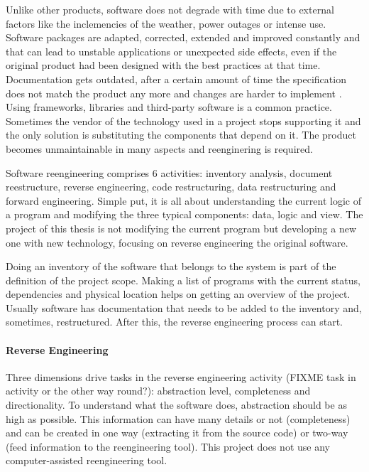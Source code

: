 Unlike other products, software does not degrade with time due to external factors like the inclemencies of the weather, power outages or intense use.
Software packages are adapted, corrected, extended and improved constantly and that can lead to unstable applications or unexpected side effects, even if the original product had been designed with the best practices at that time.
Documentation gets outdated, after a certain amount of time the specification does not match the product any more and changes are harder to implement . %
Using frameworks, libraries and third-party software is a common practice. 
Sometimes the vendor of the technology used in a project stops supporting it and the only solution is substituting the components that depend on it. 
The product becomes unmaintainable in many aspects and reenginering is required. 

Software reengineering comprises 6 activities: inventory analysis, document reestructure, reverse engineering, code restructuring, data restructuring and forward engineering.
Simple put, it is all about understanding the current logic of a program and modifying the three typical components: data, logic and view.
The project of this thesis is not modifying the current program but developing a new one with new technology, focusing on reverse engineering the original software. 

Doing an inventory of the software that belongs to the system is part of the definition of the project scope.
Making a list of programs with the current status, dependencies and physical location helps on getting an overview of the project.
Usually software has documentation that needs to be added to the inventory and, sometimes, restructured.
After this, the reverse engineering process can start.

\paragraph{Reverse Engineering}
Three dimensions drive tasks in the reverse engineering activity (FIXME task in activity or the other way round?): abstraction level, completeness and directionality.
To understand what the software does, abstraction should be as high as possible.
This information can have many details or not (completeness) and can be created in one way (extracting it from the source code) or two-way (feed information to the reengineering tool).
This project does not use any computer-assisted reengineering tool.

